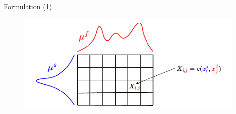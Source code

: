 \documentclass{beamer}
\begin{document}
\begin{frame}{Formulation (1)}

  \vspace{-0.3cm}
  \begin{minipage}[t]{0.6\linewidth}
  \end{minipage}%
  \hfill%
  \begin{minipage}[t]{0.8\linewidth}
  \begin{figure}
    \centering
    \includegraphics[width=\linewidth, keepaspectratio=true]{OT_new/coot_matrix_single.pdf}
  \end{figure}
  \end{minipage}

\end{frame}
\end{document}
